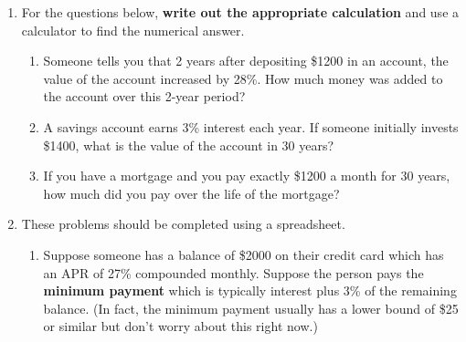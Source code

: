 \documentclass[12pt]{article}
\renewcommand{\emph}[1]{\textsf{\textbf{#1}}} %
\begin{document}
\begin{enumerate}
\begin{center}
\vspace*{-.5in}
$$ P=\frac{d\left(1-\left(1+\frac{r}{n}\right)^{(-nt)}\right)}{\left(\frac{r}{n} \right)} \hspace{1cm} \quad d= \frac{P\left(\frac{r}{n} \right)}{\left( 1- \left(1+\frac{r}{n}\right)^{(-nt)}\right)}$$
\end{center}
	\begin{enumerate}
	\item You want to take out a loan to buy a \$150,000 home. The bank offers a 30-year mortgage with an interest rate of 5.2\% compounded monthly. What will the monthly payments be?
	\vfill
	\item You loan your friend \$900. They agree to pay an annual interest rate of 4\% \emph{simple interest}. Eighteen months later, they repay the loan. How much did they pay you in total?
	\vfill
	\item You deposit \$2000 in a savings account with an APR of 3.2\%  compounded quarterly. How much will the account be worth in 10 years?
	\vfill
	\item Suppose an investment typically earns 10\% interest compounded yearly. How much would your initial investment ( or \emph{principal}) need to be in order for the future value of the account to be worth \$100,000 at the end of 40 years?
	\vfill	 
	\end{enumerate}
\newpage
\item For the questions below, \emph{write out the appropriate calculation} and use a calculator to find the numerical answer.
	\begin{enumerate}
	\item Someone tells you that 2 years after depositing \$1200 in an account, the value of the account increased by 28\%. How much money was added to the account over this 2-year period?
	\vfill
	\item A savings account earns 3\% interest each year. If someone initially invests \$1400, what is the value of the account in 30 years?
	\vfill
	\item If you have a mortgage and you pay exactly \$1200 a month for 30 years, how much did you pay over the life of the mortgage? 
	 \vfill
	\end{enumerate}
\item These problems should be completed using a spreadsheet.
	\begin{enumerate}
	\item Suppose someone has a balance of \$2000 on their credit card which has an APR of 27\% compounded monthly. Suppose the person pays the \emph{minimum payment} which is typically interest plus 3\% of the remaining balance. (In fact, the minimum payment usually has a lower bound of \$25 or similar but don't worry about this right now.)			\begin{enumerate}

\end{enumerate}
\end{enumerate}
\end{enumerate}
\end{document}
